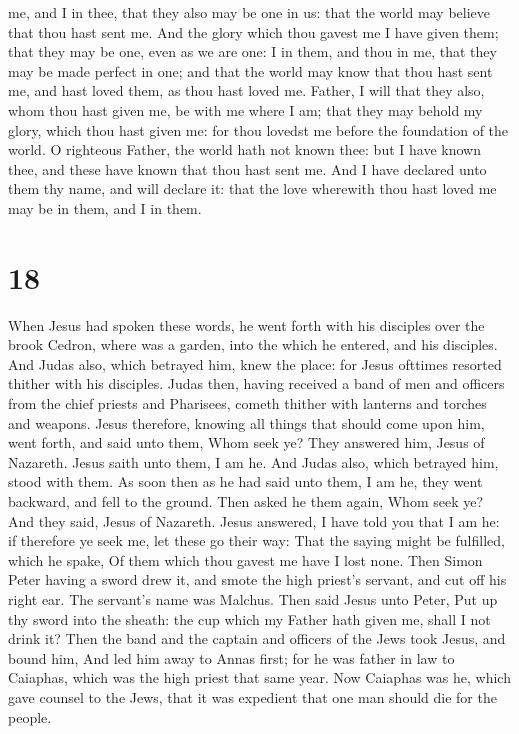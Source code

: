 me, and I in thee, that they also may be one in us: that the world may
believe that thou hast sent me.  And the glory which thou
gavest me I have given them; that they may be one, even as we are one:
 I in them, and thou in me, that they may be made perfect
in one; and that the world may know that thou hast sent me, and hast
loved them, as thou hast loved me.  Father, I will that
they also, whom thou hast given me, be with me where I am; that they may
behold my glory, which thou hast given me: for thou lovedst me before
the foundation of the world.  O righteous Father, the world
hath not known thee: but I have known thee, and these have known that
thou hast sent me.  And I have declared unto them thy name,
and will declare it: that the love wherewith thou hast loved me may be
in them, and I in them.

\hypertarget{section-17}{%
\section{18}\label{section-17}}

 When Jesus had spoken these words, he went forth with his
disciples over the brook Cedron, where was a garden, into the which he
entered, and his disciples.  And Judas also, which betrayed
him, knew the place: for Jesus ofttimes resorted thither with his
disciples.  Judas then, having received a band of men and
officers from the chief priests and Pharisees, cometh thither with
lanterns and torches and weapons.  Jesus therefore, knowing
all things that should come upon him, went forth, and said unto them,
Whom seek ye?  They answered him, Jesus of Nazareth. Jesus
saith unto them, I am he. And Judas also, which betrayed him, stood with
them.  As soon then as he had said unto them, I am he, they
went backward, and fell to the ground.  Then asked he them
again, Whom seek ye? And they said, Jesus of Nazareth. 
Jesus answered, I have told you that I am he: if therefore ye seek me,
let these go their way:  That the saying might be fulfilled,
which he spake, Of them which thou gavest me have I lost none.
 Then Simon Peter having a sword drew it, and smote the
high priest's servant, and cut off his right ear. The servant's name was
Malchus.  Then said Jesus unto Peter, Put up thy sword into
the sheath: the cup which my Father hath given me, shall I not drink it?
 Then the band and the captain and officers of the Jews
took Jesus, and bound him,  And led him away to Annas
first; for he was father in law to Caiaphas, which was the high priest
that same year.  Now Caiaphas was he, which gave counsel to
the Jews, that it was expedient that one man should die for the people.

